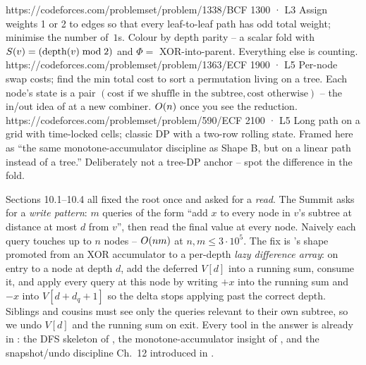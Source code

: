 \begin{mixedset}
    {https://codeforces.com/problemset/problem/1338/B}{CF 1300 · L3}
    {Assign weights 1 or 2 to edges so that every leaf-to-leaf path has odd total weight; minimise the number of~$1$s. Colour by depth parity -- a scalar fold  with $S(v) = (\operatorname{depth}(v) \bmod 2)$ and $\Phi = $ XOR-into-parent. Everything else is counting.}
    {https://codeforces.com/problemset/problem/1363/E}{CF 1900 · L5}
    {Per-node swap costs; find the min total cost to sort a permutation living on a tree. Each node's state is a pair $(\text{cost if we shuffle in the subtree},\text{cost otherwise})$ -- the in/out idea of  at a new combiner. $O(n)$ once you see the reduction.}
    {https://codeforces.com/problemset/problem/590/E}{CF 2100 · L5}
    {Long path on a grid with time-locked cells; classic DP with a two-row rolling state. Framed here as ``the same monotone-accumulator discipline as Shape B, but on a linear path instead of a tree.'' Deliberately not a tree-DP anchor -- spot the difference in the fold.}
\end{mixedset}


\begin{notebox}
Sections 10.1--10.4 all fixed the root once and asked for a
\emph{read}. The Summit asks for a \emph{write pattern}: $m$ queries of
the form ``add $x$ to every node in $v$'s subtree at distance at most
$d$ from $v$'', then read the final value at every node. Naively each
query touches up to $n$ nodes -- $O(nm)$ at $n,m\le 3\cdot 10^{5}$.
The fix is 's shape promoted from an XOR
accumulator to a per-depth \emph{lazy difference array}: on entry to a
node at depth $d$, add the deferred $\mathit{V}[d]$ into a running sum,
consume it, and apply every query at this node by writing $+x$ into the
running sum and $-x$ into $\mathit{V}[d+d_q+1]$ so the delta stops
applying past the correct depth. Siblings and cousins must see only the
queries relevant to their own subtree, so we undo $\mathit{V}[d]$ and
the running sum on exit. Every tool in the answer is already in
: the DFS skeleton of , the
monotone-accumulator insight of , and the
snapshot/undo discipline Ch.~12 introduced in .
\end{notebox}

